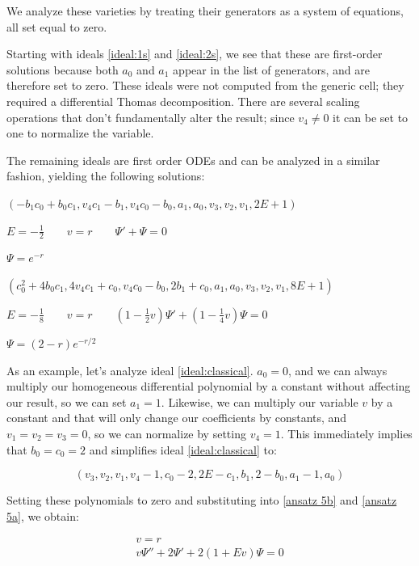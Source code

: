 \documentclass{article}
\theoremstyle{definition}
\theoremstyle{plain}
\begin{document}
We analyze these varieties by treating their generators as a system of equations, all set equal to zero.

Starting with ideals \eqref{ideal:1s} and \eqref{ideal:2s}, we see that these are first-order solutions because
both $a_0$ and $a_1$ appear in the list of generators, and are therefore set to zero.  These ideals were not computed from the generic cell;
they required a differential Thomas decomposition.  There are several scaling operations that don't fundamentally alter
the result; since $v_4 \ne 0$ it can be set to one to normalize the variable.

The remaining ideals are first order ODEs and can be analyzed in a similar fashion, yielding the following solutions:

\begin{center}
$ \left(-b_{1} c_{0} + b_{0} c_{1}, v_{4} c_{1} - b_{1}, v_{4} c_{0} - b_{0}, a_{1}, a_{0}, v_{3}, v_{2}, v_{1}, 2 E + 1\right) $

$ E = -\frac{1}{2} \qquad v=r \qquad \Psi' + \Psi = 0 $

$ \Psi = e^{-r} $

$\left(c_{0}^{2} + 4 b_{0} c_{1}, 4 v_{4} c_{1} + c_{0}, v_{4} c_{0} - b_{0}, 2 b_{1} + c_{0}, a_{1}, a_{0}, v_{3}, v_{2}, v_{1}, 8 E + 1\right)$

$ E = -\frac{1}{8} \qquad v=r \qquad (1 - \frac{1}{2} v) \Psi' + (1 - \frac{1}{4} v) \Psi = 0$

$\Psi = (2-r)e^{-r/2}$

\end{center}

As an example, let's analyze ideal \eqref{ideal:classical}.
$a_0=0$, and we can always multiply our homogeneous differential polynomial by a constant without affecting our result, so we can set $a_1=1$.
Likewise, we can multiply our variable $v$ by a constant and that will only change our coefficients by constants,
and $v_1=v_2=v_3=0$, so we can normalize by setting $v_4=1$.  This immediately implies that $b_0 = c_0 = 2$ and simplifies ideal \eqref{ideal:classical} to:

\begin{equation}
\left(v_{3}, v_{2}, v_{1}, v_{4} - 1, c_{0} - 2, 2 E - c_{1}, b_{1}, 2 - b_{0}, a_{1} - 1, a_{0}\right)
\end{equation}

Setting these polynomials to zero and substituting into \eqref{ansatz 5b} and \eqref{ansatz 5a}, we obtain:

\begin{equation}
\label{classical eq in ideal}
\begin{gathered}
v=r \\
v \Psi'' + 2 \Psi' + 2(1 + E v) \Psi = 0
\end{gathered}
\end{equation}
\end{document}

